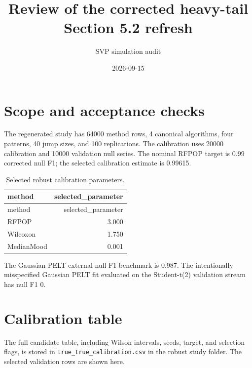 \documentclass[
  10pt,
]{article}
\title{Review of the corrected heavy-tail Section 5.2 refresh}
\author{SVP simulation audit}
\date{2026-09-15}
\begin{document}
\maketitle

\section{Scope and acceptance checks}\label{scope-and-acceptance-checks}

The regenerated study has 64000 method rows, 4 canonical algorithms,
four patterns, 40 jump sizes, and 100 replications. The calibration uses
20000 calibration and 10000 validation null series. The nominal RFPOP
target is 0.99 corrected null F1; the selected calibration estimate is
0.99615.

\begin{longtable}[]{@{}lr@{}}
\caption{Selected robust calibration parameters.}\tabularnewline
\toprule\noalign{}
method & selected\_parameter \\
\midrule\noalign{}
\endfirsthead
\toprule\noalign{}
method & selected\_parameter \\
\midrule\noalign{}
\endhead
\bottomrule\noalign{}
\endlastfoot
RFPOP & 3.000 \\
Wilcoxon & 1.750 \\
MedianMood & 0.001 \\
\end{longtable}

The Gaussian-PELT external null-F1 benchmark is 0.987. The intentionally
misspecified Gaussian PELT fit evaluated on the Student-t(2) validation
stream has null F1 0.

\section{Calibration table}\label{calibration-table}

The full candidate table, including Wilson intervals, seeds, target, and
selection flags, is stored in \texttt{true\_true\_calibration.csv} in
the robust study folder. The selected validation rows are shown here.
\end{document}
